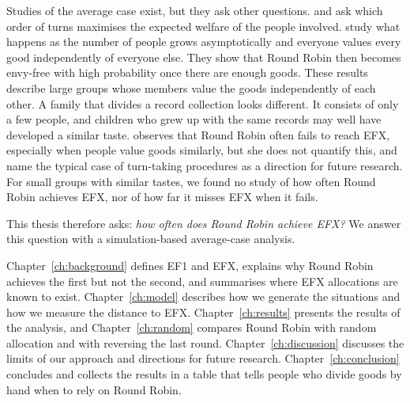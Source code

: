 Studies of the average case exist, but they ask other questions. \textcite{bouveret2011} and
\textcite{kalinowski2013} ask which order of turns maximises the expected welfare of the people
involved. \textcite{manurangsi2021} study what happens as the number of people grows asymptotically and everyone
values every good independently of everyone else. They show that Round Robin then becomes envy-free
with high probability once there are enough goods.
These results describe large groups whose members value the goods independently of each other.
A family that divides a record collection looks different. It consists of only a few people, and
children who grew up with the same records may well have developed a similar taste.
\textcite[p.~11]{branzei2025} observes that Round Robin often fails to reach EFX, especially when
people value goods similarly, but she does not quantify this, and \textcite{celine2026} name the
typical case of turn-taking procedures as a direction for future research. For small groups with
similar tastes, we found no study of how often Round Robin achieves EFX, nor of how far it misses
EFX when it fails.

This thesis therefore asks: \emph{how often does Round Robin achieve EFX?} We answer this question
with a simulation-based average-case analysis.

Chapter~\ref{ch:background} defines EF1 and EFX, explains why Round Robin achieves the first but
not the second, and summarises where EFX allocations are known to exist. Chapter~\ref{ch:model}
describes how we generate the situations and how we measure the distance to EFX.
Chapter~\ref{ch:results} presents the results of the analysis, and
Chapter~\ref{ch:random} compares Round Robin with random allocation and with reversing the last
round. Chapter~\ref{ch:discussion} discusses the limits of our approach and directions for future
research. Chapter~\ref{ch:conclusion} concludes and collects the results in a table that tells
people who divide goods by hand when to rely on Round Robin.
